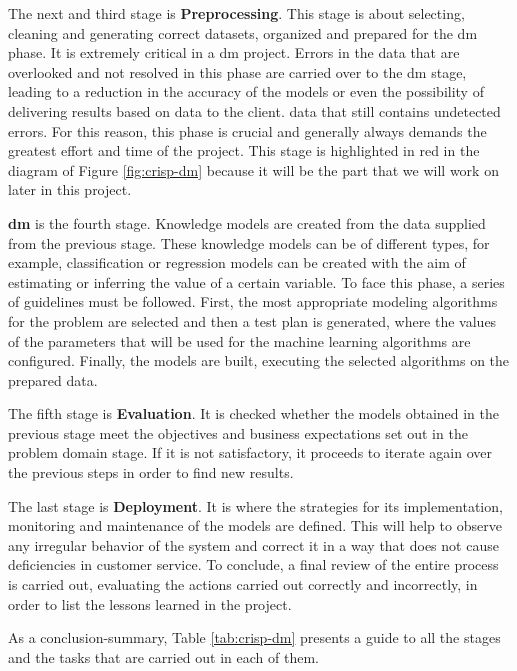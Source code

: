 The next and third stage is \textbf{Preprocessing}. This stage is about selecting, cleaning and generating correct datasets, organized and prepared for the \acrshort{dm} phase. It is extremely critical in a \acrshort{dm} project. Errors in the data that are overlooked and not resolved in this phase are carried over to the \acrshort{dm} stage, leading to a reduction in the accuracy of the models or even the possibility of delivering results based on data to the client. data that still contains undetected errors. For this reason, this phase is crucial and generally always demands the greatest effort and time of the project. This stage is highlighted in red in the diagram of Figure \ref{fig:crisp-dm} because it will be the part that we will work on later in this project.

\textbf{\acrlong{dm}} is the fourth stage. Knowledge models are created from the data supplied from the previous stage. These knowledge models can be of different types, for example, classification or regression models can be created with the aim of estimating or inferring the value of a certain variable. To face this phase, a series of guidelines must be followed. First, the most appropriate modeling algorithms for the problem are selected and then a test plan is generated, where the values of the parameters that will be used for the machine learning algorithms are configured. Finally, the models are built, executing the selected algorithms on the prepared data.

The fifth stage is \textbf{Evaluation}. It is checked whether the models obtained in the previous stage meet the objectives and business expectations set out in the problem domain stage. If it is not satisfactory, it proceeds to iterate again over the previous steps in order to find new results.

The last stage is \textbf{Deployment}. It is where the strategies for its implementation, monitoring and maintenance of the models are defined. This will help to observe any irregular behavior of the system and correct it in a way that does not cause deficiencies in customer service. To conclude, a final review of the entire process is carried out, evaluating the actions carried out correctly and incorrectly, in order to list the lessons learned in the project.

As a conclusion-summary, Table \ref{tab:crisp-dm} presents a guide to all the stages and the tasks that are carried out in each of them.

